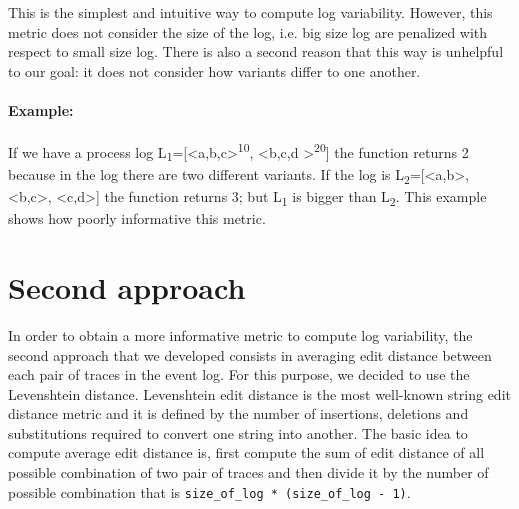 \documentclass[12pt]{article}
\begin{document}
\noindent This is the simplest and intuitive way to compute log variability. However, this metric does not consider the size of the log, i.e. big size log are penalized with respect to small size log. There is also a second reason that this way is unhelpful to our goal: it does not consider how variants differ to one another.

\paragraph*{Example:} If we have a process log L\textsubscript{1}=[\textless a,b,c\textgreater\textsuperscript{10}, \textless b,c,d \textgreater\textsuperscript{20}] the function returns 2 because in the log there are two different variants. If the log is L\textsubscript{2}=[\textless a,b\textgreater, \textless b,c\textgreater, \textless c,d\textgreater] the function returns 3; but L\textsubscript{1} is bigger than L\textsubscript{2}. This example shows how poorly informative this metric.


\section*{Second approach}

In order to obtain a more informative metric to compute log variability, the second approach that we developed consists in averaging edit distance between each pair of traces in the event log. For this purpose, we decided to use the Levenshtein distance. Levenshtein edit distance is the most well-known string edit distance metric and it is defined by the number of insertions, deletions and substitutions required to convert one string into another. The basic idea to compute average edit distance is, first compute the sum of edit distance of all possible combination of two pair of traces and then divide it by the number of possible combination that is \texttt{size\_of\_log * (size\_of\_log - 1)}.
\end{document}
